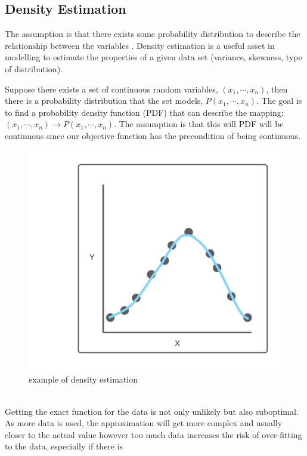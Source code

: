 \documentclass[10pt,a4paper]{report}
\begin{document}
				\subsection{Density Estimation}
					The assumption is that there exists some probability distribution to describe the relationship between the variables \autocite{sheather2004density}.
					Density estimation is a useful asset in modelling to estimate the properties of a given data set (variance, skewness, type of distribution). \par
					Suppose there exists a set of continuous random variables, $(x_1,\cdots,x_n)$, then there is a
					probability distribution that the set models, $P(x_1,\cdots,x_n)$. The goal is to find a probability density function (PDF)
					that can describe the mapping: $(x_1,\cdots,x_n) \to P(x_1,\cdots,x_n)$. The assumption is that this will PDF will be continuous
					since our objective function has the precondition of being continuous.
					\begin{figure}[h]
						\centering
						\includegraphics[scale=0.2]{density-estimation-diagram.jpg}
						\caption{example of density estimation}
						\label{fig:density-estimation}
					\end{figure} \\
					Getting the exact function for the data is not only unlikely but also suboptimal. As more data is used, the approximation will
					get more complex and usually closer to the actual value however too much data increases the risk of over-fitting to the data, especially if there is
\end{document}
